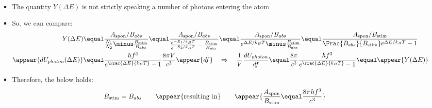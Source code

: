 \begin{frame}
\frametitle{\texorpdfstring{\culine[\sectiontitleulinecolor]{\sectiontitle}}{\sectiontitle} }

\begin{itemize}
	\item The quantity $Y(\Delta E)$ is not strictly speaking a number of photons entering the atom 
	
	\item So, we can compare:
\[
\begin{aligned}
Y(\Delta E) &\equal \frac{A_{\text {spon}} / B_{abs}}{\frac{N_{1}}{N_{2}} \minus \frac{B_{\text {stim}}}{B_{abs}}}
 \equal 
 \frac{A_{\text{spon}} / B_{abs}}{\frac{e^{-E_{1} / k_{B} T}}{e^{-E_{2} / k_{B} T}}-\frac{B_{\text {stim}}}{B_{abs}}}
  \equal 
  \frac{A_{\text {spon}} / B_{abs}}{e^{\Delta E / k_{B} T}  \minus \frac{B_{\text {stim}}}{B_{\text {abs }}}}
   \equal 
   \frac{A_{\text {spon}} / B_{\text {stim}}}{\Frac{B_{abs}}{B_{\text {stim}}} e^{\Delta E / k_{B} T}-1} \\
\appear{d U_{photon}(\Delta E)} &\equal 
 \frac{h f^{3}}{e^{\Frac{\Delta E}{k_{B} T}}-1} \frac{8 \pi V}{c^{3}} \appear{d f} \quad \Rightarrow \quad \frac{1}{V} \frac{d U_{photon}}{d f}
  \equal \frac{8 \pi}{c^{3}} \frac{h f^{3}}{e^{\Frac{\Delta E}{k_{B} T}}-1}  \equal  \appear{Y(\Delta E)}
\end{aligned}
\]
\item Therefore,  the below holds:
\[
B_{\text {stim}}=B_{abs} \qquad \appear{\text{resulting~in}} \qquad \appear{\frac{A_{\text {spon}}}{B_{\text {stim}}}  \equal \frac{8 \pi h f^{3}}{c^{3}}}
\]
\end{itemize}



\endofslide 
\end{frame}

